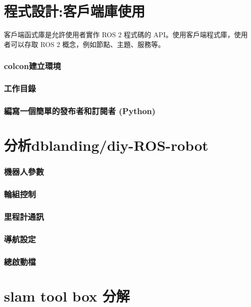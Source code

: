 \documentclass{article}
\begin{document}
\part{程式設計:客戶端庫使用}
客戶端函式庫是允許使用者實作 ROS 2 程式碼的 API。使用客戶端程式庫，使用者可以存取 ROS 2 概念，例如節點、主題、服務等。
\section{colcon建立環境}

\section{工作目錄}

\section{編寫一個簡單的發布者和訂閱者 (Python)}




\part{分析dblanding/diy-ROS-robot}

\section{機器人參數}

\section{輪組控制}

\section{里程計通訊}

\section{導航設定}

\section{總啟動檔}


\part{slam tool box 分解}

\end{document}
